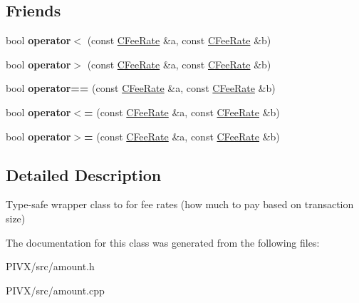 \subsection*{Friends}
\begin{DoxyCompactItemize}
\item 
\mbox{\label{class_c_fee_rate_ac6171d01f1032c0f08e804f2b19e84e8}} 
bool {\bfseries operator$<$} (const \mbox{\hyperlink{class_c_fee_rate}{C\+Fee\+Rate}} \&a, const \mbox{\hyperlink{class_c_fee_rate}{C\+Fee\+Rate}} \&b)
\item 
\mbox{\label{class_c_fee_rate_ab69eafe1cbb126cc0549bc5936422a2c}} 
bool {\bfseries operator$>$} (const \mbox{\hyperlink{class_c_fee_rate}{C\+Fee\+Rate}} \&a, const \mbox{\hyperlink{class_c_fee_rate}{C\+Fee\+Rate}} \&b)
\item 
\mbox{\label{class_c_fee_rate_a90b4daf7a7d840f47c453b9ba51744cf}} 
bool {\bfseries operator==} (const \mbox{\hyperlink{class_c_fee_rate}{C\+Fee\+Rate}} \&a, const \mbox{\hyperlink{class_c_fee_rate}{C\+Fee\+Rate}} \&b)
\item 
\mbox{\label{class_c_fee_rate_af580c9e0a2509b79a497cee50116bfcc}} 
bool {\bfseries operator$<$=} (const \mbox{\hyperlink{class_c_fee_rate}{C\+Fee\+Rate}} \&a, const \mbox{\hyperlink{class_c_fee_rate}{C\+Fee\+Rate}} \&b)
\item 
\mbox{\label{class_c_fee_rate_a3eebd7ed699091974194e47cfb2a571c}} 
bool {\bfseries operator$>$=} (const \mbox{\hyperlink{class_c_fee_rate}{C\+Fee\+Rate}} \&a, const \mbox{\hyperlink{class_c_fee_rate}{C\+Fee\+Rate}} \&b)
\end{DoxyCompactItemize}


\subsection{Detailed Description}
Type-\/safe wrapper class to for fee rates (how much to pay based on transaction size) 

The documentation for this class was generated from the following files\+:\begin{DoxyCompactItemize}
\item 
P\+I\+V\+X/src/amount.\+h\item 
P\+I\+V\+X/src/amount.\+cpp\end{DoxyCompactItemize}
